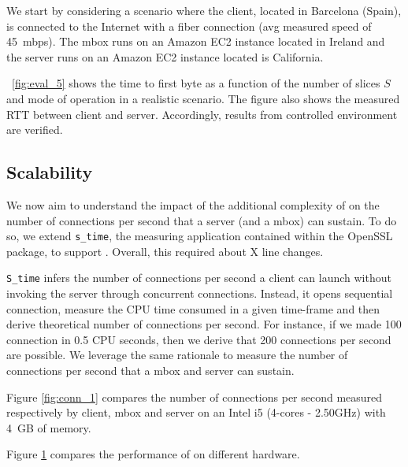 \documentclass{article}
\begin{document}
We start by considering a scenario where the client, located in
Barcelona (Spain), is connected to the Internet with a fiber
connection (avg measured speed of 45~mbps). The mbox runs on an Amazon
EC2 instance located in Ireland and the server runs on an Amazon EC2
instance located is California.

\fig~\ref{fig:eval_5} shows the time to first byte as a function of
the number of slices $S$ and mode of operation in a realistic
scenario. The figure also shows the measured RTT between client and
server. Accordingly, results from controlled environment are verified.


\newpage
\subsection{Scalability}

We now aim to understand the impact of the additional complexity of
\sppt on the number of connections per second that a server (and a
mbox) can sustain. To do so, we extend \texttt{s\_time}, the measuring
application contained within the OpenSSL package, to support
\sppt. Overall, this required about X line changes. 

\texttt{S\_time} infers the number of connections per second a client
can launch without invoking the server through concurrent
connections. Instead, it opens sequential connection, measure the CPU
time consumed in a given time-frame and then derive theoretical number
of connections per second. For instance, if we made 100 connection in
0.5 CPU seconds, then we derive that 200 connections per second are
possible. We leverage the same rationale to measure the number of
connections per second that a mbox and server can sustain.



\begin{figure*}[t]
\centering
{}
\caption{Connection per second.}
\label{fig:conn_1} 
\end{figure*}


Figure \ref{fig:conn_1} compares the number of connections per second
measured respectively by client, mbox and server on an Intel i5
(4-cores - 2.50GHz) with 4~GB of memory.


\newpage
Figure \ref{fig:conn_2} compares the performance of \sppt on different hardware.

\begin{figure}[t]
\centering
{}
\label{fig:conn_2}
\end{figure}

\end{document}
